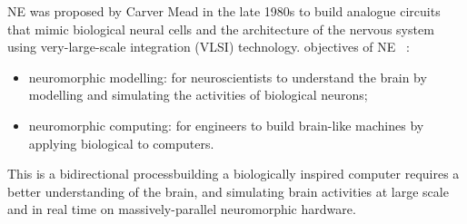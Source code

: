 \DIFdelbegin %
{%
}
\DIFdelend %
NE was proposed by Carver Mead in the late 1980s \citep{Mead:1989:AVN:64998} to build analogue circuits that mimic \DIFdelbegin {}\DIFdelend biological neural cells and the architecture of the nervous system using very-large-scale integration (VLSI) technology.
\DIFdelbegin {}\DIFdelend \DIFaddbegin {}\DIFaddend objectives of NE \DIFaddbegin {}\DIFaddend ~\citep{furber2007neural}:
\begin{itemize}
	\item neuromorphic modelling: for neuroscientists to understand the brain by modelling and simulating the activities of \DIFdelbegin {}\DIFdelend biological neurons; 
	\item neuromorphic computing: for engineers to build brain-like machines by applying biological \DIFdelbegin {}\DIFdelend \DIFaddbegin {}\DIFaddend to computers.
\end{itemize}
This is a bidirectional process\DIFdelbegin {}\DIFdelend \DIFaddbegin \DIFadd{; }\DIFaddend building a biologically inspired computer requires a better understanding of the brain, and simulating brain activities at large scale and in real time \DIFdelbegin {}\DIFdelend \DIFaddbegin {}\DIFaddend on massively-parallel neuromorphic hardware.

